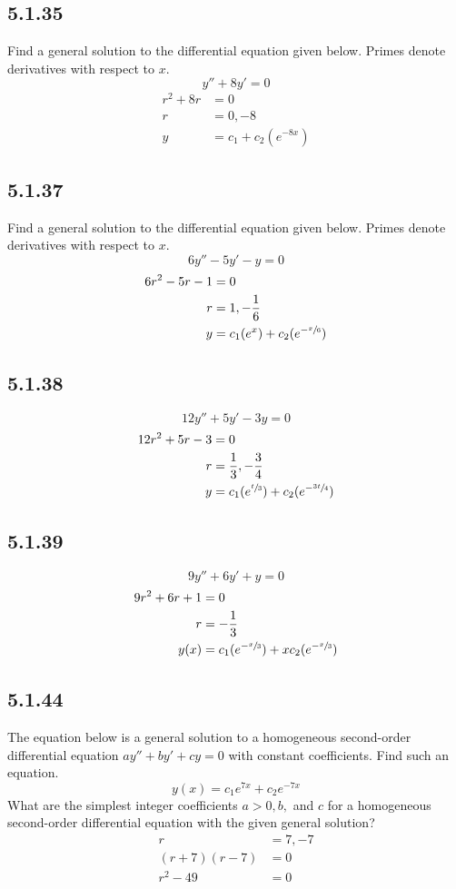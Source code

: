 \documentclass{article}
\begin{document}
\subsection{5.1.35}
Find a general solution to the differential equation given below. Primes denote derivatives with respect to $ x $.
$$ y'' + 8y' = 0 $$
\begin{align*}
	r^2 + 8r & = 0 \\
	r & = 0, -8 \\
	y & = c_1 + c_2(e^{-8x})
\end{align*}

\subsection{5.1.37}
Find a general solution to the differential equation given below. Primes denote derivatives with respect to $ x $.
$$ 6y'' - 5y' - y = 0 $$
\begin{align*}
	6r^2 - 5r - 1 & = 0 \\
	r & = 1, -\frac{1}{6} \\
	y & = c_1(e^x) + c_2(e^{-\sfrac{x}{6}})
\end{align*}

\subsection{5.1.38}
$$ 12y'' + 5y' - 3y = 0 $$
\begin{align*}
	12r^2 + 5r - 3 & = 0 \\
	r & = \frac{1}{3}, -\frac{3}{4} \\
	y & = c_1(e^{\sfrac{t}{3}}) + c_2(e^{-\sfrac{3t}{4}})
\end{align*}

\subsection{5.1.39}
$$ 9y'' + 6y' + y = 0 $$
\begin{align*}
	9r^2 + 6r + 1 & = 0 \\
	r & = -\frac{1}{3} \\
	y(x) & = c_1(e^{-\sfrac{x}{3}}) + xc_2(e^{-\sfrac{x}{3}})
\end{align*}

\subsection{5.1.44}
The equation below is a general solution to a homogeneous second-order differential equation $ ay'' + by' + cy = 0 $ with constant coefficients. Find such an equation.
$$ y(x) = c_1e^{7x} + c_2e^{-7x} $$
What are the simplest integer coefficients $ a > 0, b, $ and $ c $ for a homogeneous second-order differential equation with the given general solution?
\begin{align*}
	r & = 7, -7 \\
	(r + 7)(r - 7) & = 0 \\
	r^2 - 49 & = 0
\end{align*}
\end{document}
